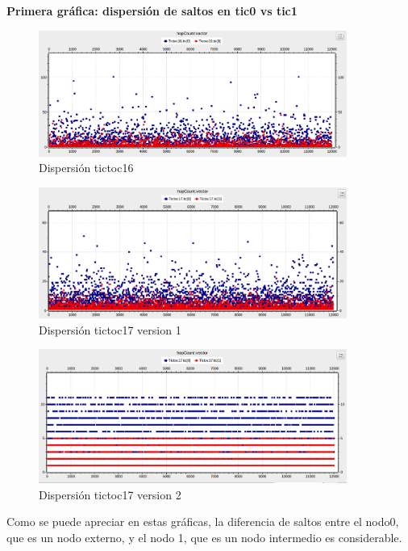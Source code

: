 \documentclass{article}
\begin{document}
		\newpage
		
		\textbf{Primera gráfica: dispersión de saltos en tic0 vs tic1}\\
	
		
		\begin{figure}[htb]
		\centering
		\includegraphics[width=0.9\textwidth]{tictoc16/figura1.png}
		\caption{Dispersión tictoc16}
		\end {figure}
		
		\begin{figure}[htb]
		\centering
		\includegraphics[width=0.9\textwidth]{tictoc17v1/figura1.png}
		\caption{Dispersión tictoc17 version 1}
		\end {figure}

		\begin{figure}[htb]
		\centering
		\includegraphics[width=0.9\textwidth]{tictoc17v2/figura1.png}
		\caption{Dispersión tictoc17 version 2}
		\end {figure}
		\newpage
		
		Como se puede apreciar en estas gráficas, la diferencia de saltos entre el nodo0, que es un nodo externo, y el nodo 1, que es un nodo intermedio es considerable.
		
\end{document}
